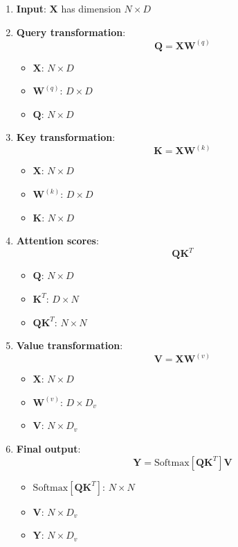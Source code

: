 \documentclass[11pt,a4paper]{article}
\theoremstyle{definition}
\theoremstyle{plain}
\theoremstyle{remark}
\begin{document}
\begin{enumerate}
    \item \textbf{Input}: $\mathbf{X}$ has dimension $N \times D$
    
    \item \textbf{Query transformation}: 
    \[
    \mathbf{Q} = \mathbf{X}\mathbf{W}^{(q)}
    \]
    \begin{itemize}
        \item $\mathbf{X}$: $N \times D$
        \item $\mathbf{W}^{(q)}$: $D \times D$
        \item $\mathbf{Q}$: $N \times D$
    \end{itemize}
    
    \item \textbf{Key transformation}:
    \[
    \mathbf{K} = \mathbf{X}\mathbf{W}^{(k)}
    \]
    \begin{itemize}
        \item $\mathbf{X}$: $N \times D$
        \item $\mathbf{W}^{(k)}$: $D \times D$
        \item $\mathbf{K}$: $N \times D$
    \end{itemize}
    
    \item \textbf{Attention scores}:
    \[
    \mathbf{Q}\mathbf{K}^T
    \]
    \begin{itemize}
        \item $\mathbf{Q}$: $N \times D$
        \item $\mathbf{K}^T$: $D \times N$
        \item $\mathbf{Q}\mathbf{K}^T$: $N \times N$
    \end{itemize}
    
    \item \textbf{Value transformation}:
    \[
    \mathbf{V} = \mathbf{X}\mathbf{W}^{(v)}
    \]
    \begin{itemize}
        \item $\mathbf{X}$: $N \times D$
        \item $\mathbf{W}^{(v)}$: $D \times D_v$
        \item $\mathbf{V}$: $N \times D_v$
    \end{itemize}
    
    \item \textbf{Final output}:
    \[
    \mathbf{Y} = \text{Softmax}[\mathbf{Q}\mathbf{K}^T]\mathbf{V}
    \]
    \begin{itemize}
        \item $\text{Softmax}[\mathbf{Q}\mathbf{K}^T]$: $N \times N$
        \item $\mathbf{V}$: $N \times D_v$
        \item $\mathbf{Y}$: $N \times D_v$
    \end{itemize}
\end{enumerate}
\end{document}
